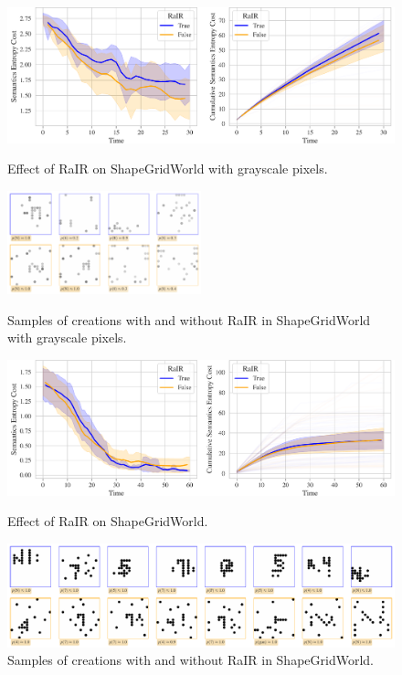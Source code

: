 \begin{figure}[h]
    \centering
    \includegraphics[width=\textwidth]{images/rair_comparison_sgw_color_cropped.pdf}
    \caption{Effect of RaIR on ShapeGridWorld with grayscale pixels.}
    \label{fig:rair-color-sgw}
    \vspace{12pt}
    \includegraphics[width=0.5\textwidth]{images/rair_samples_sgw_color.pdf}
    \caption{Samples of creations with and without RaIR in ShapeGridWorld with grayscale pixels.}
    \label{fig:rair-samples-color-sgw}
    \vspace{12pt}
    \includegraphics[width=\textwidth]{images/rair_comparison_sgw_categories_cropped.pdf}
    \caption{Effect of RaIR on ShapeGridWorld.}
    \label{fig:rair-sgw}
    \vspace{12pt}
    \includegraphics[width=\textwidth]{images/rair_samples_sgw_categories.pdf}
    \caption[Samples of creations with and without RaIR in ShapeGridWorld.]{Samples of creations with and without RaIR in ShapeGridWorld. %
    }
    \label{fig:rair-samples-sgw}
\end{figure}


